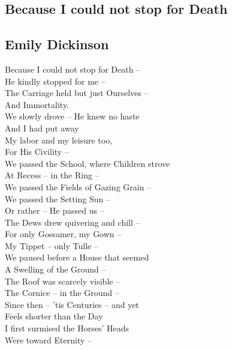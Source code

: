 \documentclass[a4,12pt]{article}
\begin{document}
\begin{center}
        \newpage
        \section*{Because I could not stop for Death}
        \label{sec:Because I could not stop for Death}
        \subsection*{Emily Dickinson}

        \vspace{15pt}
        Because I could not stop for Death –\\
        He kindly stopped for me –\\
        The Carriage held but just Ourselves –\\
        And Immortality.\\

        \vspace{15pt}
        We slowly drove – He knew no haste\\
        And I had put away\\
        My labor and my leisure too,\\
        For His Civility –\\

        \vspace{15pt}
        We passed the School, where Children strove\\
        At Recess – in the Ring –\\
        We passed the Fields of Gazing Grain –\\
        We passed the Setting Sun –\\

        \vspace{15pt}
        Or rather – He passed us –\\
        The Dews drew quivering and chill –\\
        For only Gossamer, my Gown –\\
        My Tippet – only Tulle –\\

        \vspace{15pt}
        We paused before a House that seemed\\
        A Swelling of the Ground –\\
        The Roof was scarcely visible –\\
        The Cornice – in the Ground –\\

        \vspace{15pt}
        Since then – 'tis Centuries – and yet\\
        Feels shorter than the Day\\
        I first surmised the Horses' Heads\\
        Were toward Eternity –\\

 

    \end{center}
\end{document}
